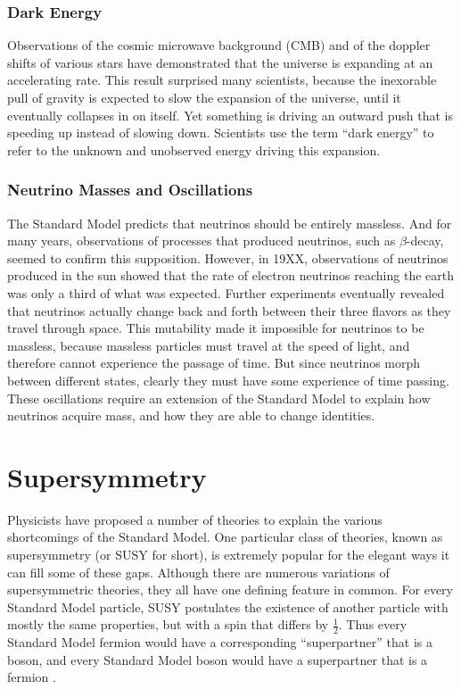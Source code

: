 \subsubsection*{Dark Energy}
Observations of the cosmic microwave background (CMB) and of the %
doppler shifts of various stars have demonstrated that the universe is
expanding at an accelerating rate. This result surprised many %
scientists, because the inexorable pull of gravity is expected to slow
the expansion of the universe, until it eventually collapses in on itself. Yet something
is driving an outward push that is speeding up instead of slowing
down. Scientists use the term ``dark energy'' to refer to the unknown
and unobserved energy driving this expansion.

\subsubsection*{Neutrino Masses and Oscillations}
The Standard Model predicts that neutrinos should be entirely
massless. And for many years, observations of processes that produced
neutrinos, such as $\beta$-decay, seemed to confirm this
supposition. However, in 19XX, observations of neutrinos produced in %
the sun showed that the rate of electron neutrinos reaching the earth
was only a third of what was expected. Further experiments eventually %
revealed that neutrinos actually change back and forth between their three %
flavors as they travel through space. This mutability made it impossible
for neutrinos to be massless, because massless particles must travel
at the speed of light, and therefore cannot experience the passage of
time. But since neutrinos morph between different states, clearly they
must have some experience of time passing. These
oscillations require an extension of the Standard Model to
explain how neutrinos acquire mass, and how they are able to
change identities.

\section{Supersymmetry}
\label{sec:susy}

Physicists have proposed a number of theories to explain the various
shortcomings of the Standard Model. One particular class of theories,
known as supersymmetry (or SUSY for short), is extremely popular for
the elegant ways it can fill some of these gaps. Although there
are numerous variations of supersymmetric theories, they all have one
defining feature in common. For every Standard Model particle, SUSY
postulates the existence of another particle with mostly the same
properties, but with a spin that differs by $\frac{1}{2}$. Thus every Standard Model
fermion would have a corresponding ``superpartner'' that is a boson,
and every Standard Model boson would have a superpartner that is a
fermion \cite{susyprimer}.

